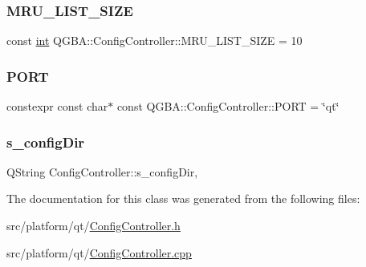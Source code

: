 \subsubsection{\texorpdfstring{M\+R\+U\+\_\+\+L\+I\+S\+T\+\_\+\+S\+I\+ZE}{MRU\_LIST\_SIZE}}
{\footnotesize\ttfamily const \mbox{\hyperlink{ioapi_8h_a787fa3cf048117ba7123753c1e74fcd6}{int}} Q\+G\+B\+A\+::\+Config\+Controller\+::\+M\+R\+U\+\_\+\+L\+I\+S\+T\+\_\+\+S\+I\+ZE = 10\hspace{0.3cm}{\ttfamily [static]}}

\mbox{\label{class_q_g_b_a_1_1_config_controller_a4d9eea8199d4ac98df218f87f3feab9e}} 
\subsubsection{\texorpdfstring{P\+O\+RT}{PORT}}
{\footnotesize\ttfamily constexpr const char$\ast$ const Q\+G\+B\+A\+::\+Config\+Controller\+::\+P\+O\+RT = \char`\"{}qt\char`\"{}\hspace{0.3cm}{\ttfamily [static]}}

\mbox{\label{class_q_g_b_a_1_1_config_controller_ad456bac785469882f25efadd464c0508}} 
\subsubsection{\texorpdfstring{s\+\_\+config\+Dir}{s\_configDir}}
{\footnotesize\ttfamily Q\+String Config\+Controller\+::s\+\_\+config\+Dir\hspace{0.3cm}{\ttfamily [static]}, {\ttfamily [private]}}



The documentation for this class was generated from the following files\+:\begin{DoxyCompactItemize}
\item 
src/platform/qt/\mbox{\hyperlink{_config_controller_8h}{Config\+Controller.\+h}}\item 
src/platform/qt/\mbox{\hyperlink{_config_controller_8cpp}{Config\+Controller.\+cpp}}\end{DoxyCompactItemize}
